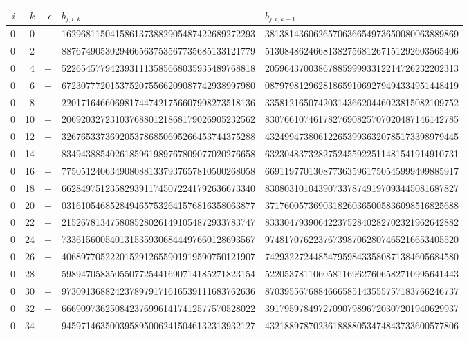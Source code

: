 \begin{longtable}{rrrll}
$i$ & $k$ & $\epsilon$ & $b_{j,i,k}$ & $b_{j,i,k+1}$ \\ \hline\endhead
0 & 0 & + & 1629681150415861373882905487422689272293 & 3813814360626570636654973650080063889869 \\
0 & 2 & + & 8876749053029466563753567735685133121779 & 5130848624668138275681267151292603565406 \\
0 & 4 & + & 5226545779423931113585668035935489768818 & 2059643700386788599993312214726232202313 \\
0 & 6 & + & 6723077720153752075566209087742938997980 & 0879798129628186591069279494334951448419 \\
0 & 8 & + & 2201716466069817447421756607998273518136 & 3358121650742031436620446023815082109752 \\
0 & 10 & + & 2069203272310376880121868179026905232562 & 8307661074617827690825707020487146142785 \\
0 & 12 & + & 3267653373692053786850695266453744375288 & 4324994738061226539936320785173398979445 \\
0 & 14 & + & 8349438854026185961989767809077020276658 & 6323048373282752455922511481541914910731 \\
0 & 16 & + & 7750512406349080881337937657810500268058 & 6691197701308773635961750545999499885917 \\
0 & 18 & + & 6628497512358293911745072241792636673340 & 8308031010439073378749197093445081687827 \\
0 & 20 & + & 0316105468528494657532641576816358063877 & 3717600573690318260365005836098516825688 \\
0 & 22 & + & 2152678134758085280261491054872933783747 & 8333047939064223752840282702321962642882 \\
0 & 24 & + & 7336156005401315359306844497660128693567 & 9748170762237673987062807465216653405520 \\
0 & 26 & + & 4068977052220152912655901919590750121907 & 7429322724485479598433580871384605684580 \\
0 & 28 & + & 5989470583505507725441690714185271823154 & 5220537811060581169627606582710995641443 \\
0 & 30 & + & 9730913688242378979171616539111683762636 & 8703955676884666585143555757183766246737 \\
0 & 32 & + & 6669097362508423769961417412577570528022 & 3917959784972709079896720307201940629937 \\
0 & 34 & + & 9459714635003958950062415046132313932127 & 4321889787023618888053474843733600577806 \\

\end{longtable}
